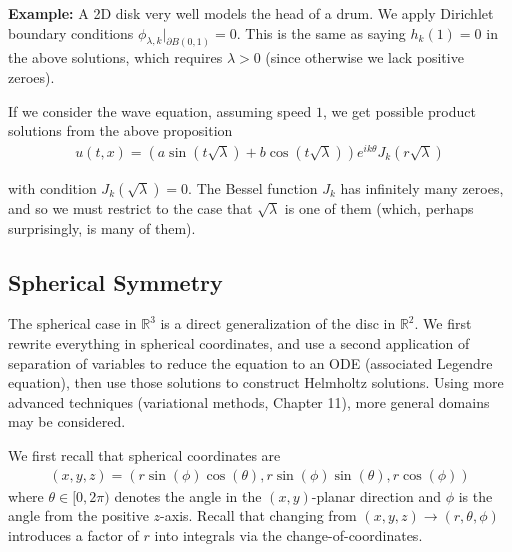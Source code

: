 \documentclass{article}
\newcommand{\R}{{\mathbb{R}}}
\newcommand{\pd}{\partial}
\begin{document}
	\vspace{0.25 cm}
	
	\textbf{Example:} A 2D disk very well models the head of a drum. We apply Dirichlet boundary conditions $\phi_{\lambda,k}|_{\pd B(0,1)} = 0$. This is the same as saying $h_{k}(1) = 0$ in the above solutions, which requires $\lambda >0$ (since otherwise we lack positive zeroes).
	
	 If we consider the wave equation, assuming speed $1$, we get possible product solutions from the above proposition 
	\begin{align*}
		u(t,x) = (a \sin(t\sqrt{\lambda}) + b\cos(t\sqrt{\lambda})) e^{ik\theta} J_{k}(r\sqrt{\lambda})
	\end{align*}
	
	with condition $J_{k}(\sqrt{\lambda}) = 0$. The Bessel function $J_k$ has infinitely many zeroes, and so we must restrict to the case that $\sqrt{\lambda}$ is one of them (which, perhaps surprisingly, is many of them).
	
	
	
	\subsection{Spherical Symmetry}
	
	The spherical case in $\R^{3}$ is a direct generalization of the disc in $\R^{2}$. We first rewrite everything in spherical coordinates, and use a second application of separation of variables to reduce the equation to an ODE (associated Legendre equation), then use those solutions to construct Helmholtz solutions. Using more advanced techniques (variational methods, Chapter 11), more general domains may be considered. 
	
	We first recall that spherical coordinates are 
	\begin{align*}
		(x,y,z) = (r\sin(\phi)\cos(\theta), r\sin(\phi)\sin(\theta), r\cos(\phi))
	\end{align*}
	where $\theta \in [0,2\pi)$ denotes the angle in the $(x,y)$-planar direction and $\phi$ is the angle from the positive $z$-axis. Recall that changing from $(x,y,z) \to (r,\theta,\phi)$ introduces a factor of $r$ into integrals via the change-of-coordinates. 
	
\end{document}
